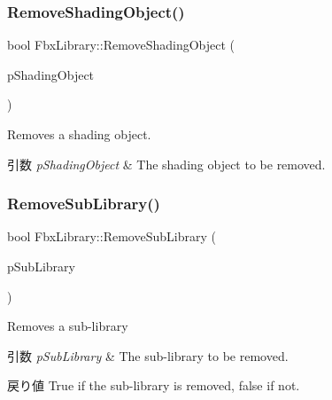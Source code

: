 \mbox{\label{class_fbx_library_aafacfb4acfe28124217e4b0ffb0dcadc}} 
\subsubsection{\texorpdfstring{Remove\+Shading\+Object()}{RemoveShadingObject()}}
{\footnotesize\ttfamily bool Fbx\+Library\+::\+Remove\+Shading\+Object (\begin{DoxyParamCaption}\item[{\hyperlink{class_fbx_object}{Fbx\+Object} $\ast$}]{p\+Shading\+Object }\end{DoxyParamCaption})}

Removes a shading object. 
\begin{DoxyParams}{引数}
{\em p\+Shading\+Object} & The shading object to be removed. \\
\hline
\end{DoxyParams}
\mbox{\label{class_fbx_library_af49b9811d383dbdc86bc805b72970ad9}} 
\subsubsection{\texorpdfstring{Remove\+Sub\+Library()}{RemoveSubLibrary()}}
{\footnotesize\ttfamily bool Fbx\+Library\+::\+Remove\+Sub\+Library (\begin{DoxyParamCaption}\item[{\hyperlink{class_fbx_library}{Fbx\+Library} $\ast$}]{p\+Sub\+Library }\end{DoxyParamCaption})}

Removes a sub-\/library 
\begin{DoxyParams}{引数}
{\em p\+Sub\+Library} & The sub-\/library to be removed. \\
\hline
\end{DoxyParams}
\begin{DoxyReturn}{戻り値}
{\ttfamily True} if the sub-\/library is removed, {\ttfamily false} if not. 
\end{DoxyReturn}
\mbox{\label{class_fbx_library_a4746780aa4ba19fdbf1462fb371967c9}} 
